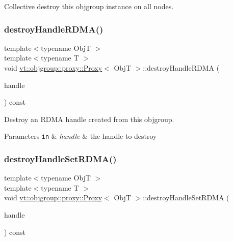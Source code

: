 Collective destroy this objgroup instance on all nodes. 

\mbox{\label{structvt_1_1objgroup_1_1proxy_1_1_proxy_a7510598b2915dec55b90bf9ae61c7df9}} 
\subsubsection{\texorpdfstring{destroy\+Handle\+R\+D\+M\+A()}{destroyHandleRDMA()}}
{\footnotesize\ttfamily template$<$typename ObjT $>$ \\
template$<$typename T $>$ \\
void \hyperlink{structvt_1_1objgroup_1_1proxy_1_1_proxy}{vt\+::objgroup\+::proxy\+::\+Proxy}$<$ ObjT $>$\+::destroy\+Handle\+R\+D\+MA (\begin{DoxyParamCaption}\item[{\hyperlink{structvt_1_1rdma_1_1_handle}{vt\+::rdma\+::\+Handle}$<$ T $>$}]{handle }\end{DoxyParamCaption}) const}



Destroy an R\+D\+MA handle created from this objgroup. 


\begin{DoxyParams}[1]{Parameters}
\mbox{\tt in}  & {\em handle} & the handle to destroy \\
\hline
\end{DoxyParams}
\mbox{\label{structvt_1_1objgroup_1_1proxy_1_1_proxy_a9211f7a2459cfcb28f8b90dbdc77c8bc}} 
\subsubsection{\texorpdfstring{destroy\+Handle\+Set\+R\+D\+M\+A()}{destroyHandleSetRDMA()}}
{\footnotesize\ttfamily template$<$typename ObjT $>$ \\
template$<$typename T $>$ \\
void \hyperlink{structvt_1_1objgroup_1_1proxy_1_1_proxy}{vt\+::objgroup\+::proxy\+::\+Proxy}$<$ ObjT $>$\+::destroy\+Handle\+Set\+R\+D\+MA (\begin{DoxyParamCaption}\item[{\hyperlink{structvt_1_1rdma_1_1_handle_set}{vt\+::rdma\+::\+Handle\+Set}$<$ T $>$}]{handle }\end{DoxyParamCaption}) const}



